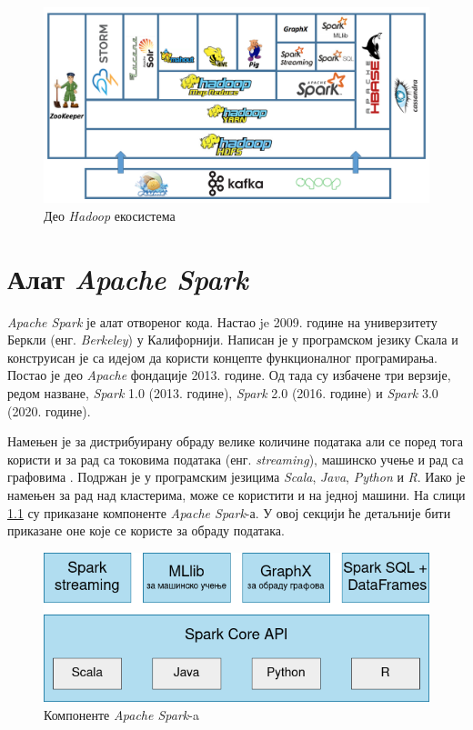 \documentclass[12pt,oneside]{memoir}
\begin{document}
\begin{figure}[!ht]
  \centering
  \includegraphics[width=1\textwidth]{pictures/hadoop_ecosystem.png}
  \caption{Део \textit{Hadoop} екосистема}
  \label{fig:hadoop_ecosystem}
\end{figure}

\chapter{Алат \textit{Apache Spark}}
\label{chp:spark}


\textit{Apache Spark} је алат отвореног кода. Настао je 2009. године на универзитету Беркли (енг. \textit{Berkeley}) у Калифорнији. Написан је у програмском језику Скала и конструисан је са идејом да користи концепте функционалног програмирања. Постао је део \textit{Apache} фондације 2013. године. Од тада су избачене три верзије, редом назване, \textit{Spark} 1.0 (2013. године), \textit{Spark} 2.0 (2016. године) и \textit{Spark} 3.0 (2020. године).

Намењен је за дистрибуирану обраду велике количине података али  се поред тога користи и за рад са токовима података (енг. \textit{streaming}), машинско учење и рад са графовима \cite{spark_guide}. Подржан је у програмским језицима \textit{Scala}, \textit{Java}, \textit{Python} и \textit{R}. Иако је намењен за рад над кластерима, може се користити и на једној машини. На слици \ref{fig:spark_kompot} су приказане компоненте \textit{Apache Spark}-а. У овој секцији ће детаљније бити приказане оне које се користе за обраду података.

\begin{figure}[!ht]
  \centering
  \includegraphics[width=1\textwidth]{pictures/spark_components.png}
  \caption{Компоненте \textit{Apache Spark}-a}
  \label{fig:spark_kompot}
\end{figure}
\end{document}
